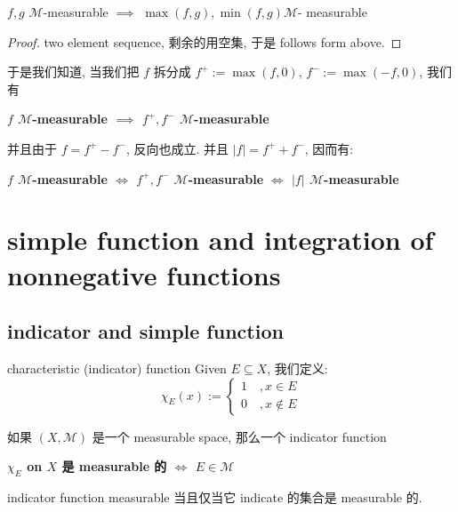 \documentclass[lang=cn,11pt]{elegantbook}
\begin{document}
\begin{corollary}
    $f,g$ $\mathcal{M}$-measurable $\implies$ $\max(f,g), \min(f,g)$$\mathcal{M}$- measurable 
\end{corollary}
\begin{proof}
    two element sequence, 剩余的用空集, 于是 follows form above.
\end{proof}



\begin{remark}
    于是我们知道, 当我们把 $f$ 拆分成 $f^+ := \max(f,0)$, $f^- := \max(-f,0)$, 我们有 

    \begin{center}
 \textbf{ $f$ $\mathcal{M}$-measurable $\implies$ $f^+, f^-$ $\mathcal{M}$-measurable}
    \end{center}

并且由于 $f = f^+ - f^-$, 反向也成立. 并且 $|f| = f^+ + f^-$, 因而有:
\begin{center}
     \textbf{ $f$ $\mathcal{M}$-measurable $\Longleftrightarrow$ $f^+, f^-$ $\mathcal{M}$-measurable} \textbf{$\Longleftrightarrow$ $|f|$ $\mathcal{M}$-measurable}
\end{center}
\end{remark}








\chapter{simple function and integration of nonnegative functions}

\section{indicator and simple function}
\begin{definition}{characteristic (indicator) function}
    Given $E \subseteq X$, 我们定义:
    $$
    \chi_E(x) := \begin{cases}
        1 \quad,x\in E\\
        0 \quad, x\not \in E
    \end{cases}
    $$
\end{definition}

\begin{lemma}
如果 $(X,\mathcal{M})$ 是一个 measurable space, 那么一个 indicator function
\begin{center}
   \textbf{ $\chi_E$ on $X$ 是 measurable 的 $\Longleftrightarrow$ $E \in  \mathcal{M}$}
\end{center}
\end{lemma}
indicator function measurable 当且仅当它 indicate 的集合是 measurable 的.
\end{document}
